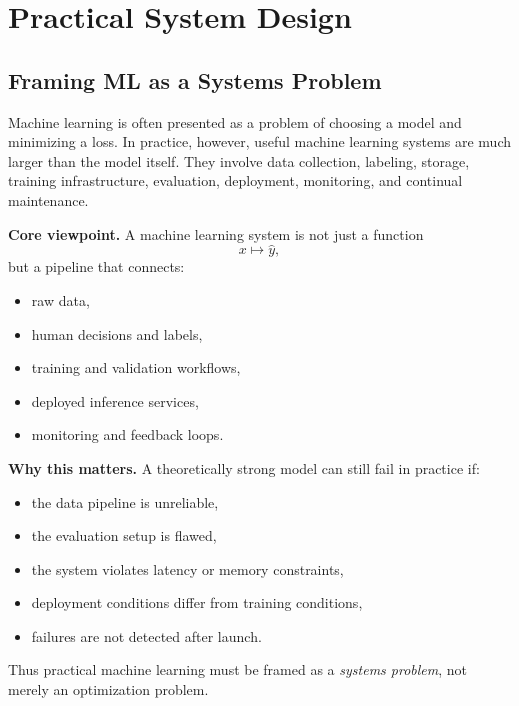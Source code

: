 \chapter{Practical System Design}

\section{Framing ML as a Systems Problem}

Machine learning is often presented as a problem of choosing a model and minimizing a loss. In practice, however, useful machine learning systems are much larger than the model itself. They involve data collection, labeling, storage, training infrastructure, evaluation, deployment, monitoring, and continual maintenance.

\medskip

\noindent
\textbf{Core viewpoint.}
A machine learning system is not just a function
\[
x \mapsto \hat{y},
\]
but a pipeline that connects:
\begin{itemize}
    \item raw data,
    \item human decisions and labels,
    \item training and validation workflows,
    \item deployed inference services,
    \item monitoring and feedback loops.
\end{itemize}

\medskip

\noindent
\textbf{Why this matters.}
A theoretically strong model can still fail in practice if:
\begin{itemize}
    \item the data pipeline is unreliable,
    \item the evaluation setup is flawed,
    \item the system violates latency or memory constraints,
    \item deployment conditions differ from training conditions,
    \item failures are not detected after launch.
\end{itemize}

\medskip

\noindent
Thus practical machine learning must be framed as a \emph{systems problem}, not merely an optimization problem.

\medskip

